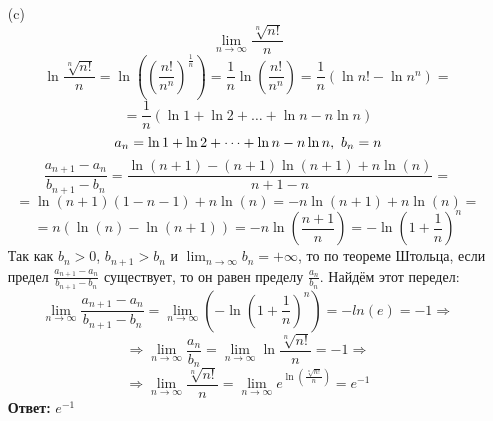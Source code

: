 \documentclass[a4paper]{article}
\renewcommand{\f}[2]{\frac{#1}{#2}}
\newcommand{\ts}{\text{\space}}
\renewcommand{\r}{\Rightarrow}
\begin{document}
\begin{enumerate}
\begin{enumerate}
        \item[(c)]
        $$\lim_{n \to \infty} \f{\sqrt[n]{n!}}{n}$$
        $$\ln{\f{\sqrt[n]{n!}}{n}} = \ln((\f{n!}{n^n})^{\f{1}{n}}) = \f{1}{n}\ln(\f{n!}{n^n}) = \f{1}{n}(\ln{n!}-\ln{n^n}) = $$
        $$=\f{1}{n}(\ln{1}+\ln{2}+\dots+\ln{n}-n\ln{n})$$
        $$a_n = \ln{1}+\ln{2}+\dots+\ln{n}-n\ln{n}, \ts b_n =  n$$
        $$\f{a_{n+1}-a_{n}}{b_{n+1} - b_{n}} = \f{\ln(n+1)-(n+1)\ln(n+1)+n\ln(n)}{n+1 - n} = $$
        $$= \ln(n+1)(1-n-1)+n\ln(n) = -n\ln(n+1)+n\ln(n) = $$
        $$= n(\ln(n) - \ln(n+1)) = -n\ln(\f{n+1}{n}) = -\ln(1+\f{1}{n})^n$$
        Так как $b_n>0$, $b_{n+1}>b_n$ и $\lim_{n \to \infty}b_n = +\infty$, то по теореме Штольца, если предел $\f{a_{n+1}-a_{n}}{b_{n+1} - b_{n}}$ существует, то он равен пределу $\f{a_n}{b_n}$. Найдём этот передел:
        $$\lim_{n \to \infty}\f{a_{n+1}-a_{n}}{b_{n+1} - b_{n}} = \lim_{n \to \infty} (-\ln(1+\f{1}{n})^n) = -ln(e) = -1 \r $$
        $$\r \lim_{n \to \infty}\f{a_n}{b_n} = \lim_{n \to \infty}\ln{\f{\sqrt[n]{n!}}{n}} = -1 \r$$
        $$\r \lim_{n \to \infty} \f{\sqrt[n]{n!}}{n} = \lim_{n \to \infty} e^{\ln(\f{\sqrt[n]{n!}}{n})} = e^{-1}$$
        \textbf{Ответ: } $e^{-1}$
    \end{enumerate}

    
\end{enumerate}
\end{document}
